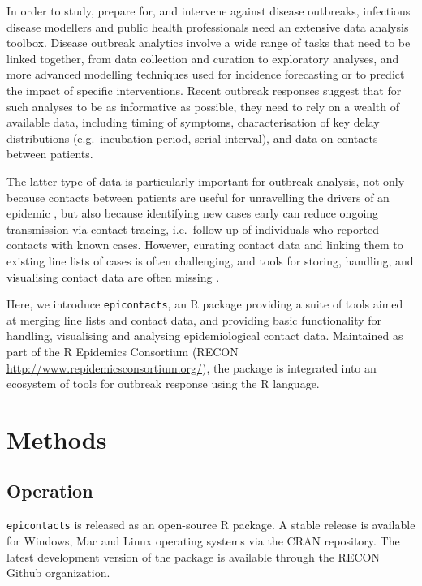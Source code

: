 \documentclass[9pt,a4paper,]{extarticle}
\theoremstyle{definition}
\theoremstyle{definition}
\theoremstyle{definition}
\theoremstyle{remark}
\begin{document}
In order to study, prepare for, and intervene against disease outbreaks, infectious disease modellers and public health professionals need an extensive data analysis toolbox. Disease outbreak analytics involve a wide range of tasks that need to be linked together, from data collection and curation to exploratory analyses, and more advanced modelling techniques used for incidence forecasting\citep{funk:2016}\citep{nouvellet:2017} or to predict the impact of specific interventions\citep{nouvellet:2015}\citep{parker:2015}. Recent outbreak responses suggest that for such analyses to be as informative as possible, they need to rely on a wealth of available data, including timing of symptoms, characterisation of key delay distributions (e.g.~incubation period, serial interval), and data on contacts between patients\citep{cauchemez:2014}\citep{aylward:2014}\citep{agua-agum:2015}\citep{cori:2017}.

The latter type of data is particularly important for outbreak analysis, not only because contacts between patients are useful for unravelling the drivers of an epidemic \citep{agua-agum:2016}\citep{cauchemez:2016}, but also because identifying new cases early can reduce ongoing transmission via contact tracing, i.e.~follow-up of individuals who reported contacts with known cases\citep{senga:2017}\citep{saurabh:2017}. However, curating contact data and linking them to existing line lists of cases is often challenging, and tools for storing, handling, and visualising contact data are often missing \citep{who:2009}\citep{rakesh:2014}.

Here, we introduce \texttt{epicontacts}, an R\citep{rcore} package providing a suite of tools aimed at merging line lists and contact data, and providing basic functionality for handling, visualising and analysing epidemiological contact data. Maintained as part of the R Epidemics Consortium (RECON \url{http://www.repidemicsconsortium.org/}), the package is integrated into an ecosystem of tools for outbreak response using the R language.

\section{Methods}\label{methods}

\subsection{Operation}\label{operation}

\texttt{epicontacts} is released as an open-source R package. A stable release is available for Windows, Mac and Linux operating systems via the CRAN repository. The latest development version of the package is available through the RECON Github organization.
\end{document}
